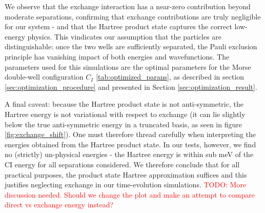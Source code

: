 \documentclass{subfiles}
\begin{document}
We observe that the exchange interaction has a near-zero contribution beyond moderate separations, confirming that exchange contributions are truly negligible for our system - and that the Hartree product state captures the correct low-energy physics. This vindicates our assumption that the particles are distinguishable: once the two wells are sufficiently separated, the Pauli exclusion principle has vanishing impact of both energies and wavefunctions. The parameters used for this simulations are the optimal parameters for the Morse double-well configuration $C_I$ \ref{tab:optimized_parans}, as described in section \ref{sec:optimization_procedure} and presented in Section \ref{sec:optimization_result}. 

A final caveat: because the Hartree product state is not anti-symmetric, the Hartree energy is not variational with respect to exchange (it can lie slightly below the true anti-symmetric energy in a truncated basis, as seen in figure \ref{fig:exchange_shift}). One must therefore thread carefully when interpreting the energies obtained from the Hartree product state. In our tests, however, we find no (strictly) un-physical energies - the Hartree energy is within sub meV of the CI energy for all separations considered. We therefore conclude that for all practical purposes, the product state Hartree approximation suffices and this justifies neglecting exchange in our time-evolution simulations. \textcolor{red}{TODO: More discussion needed. Should we change the plot and make an attempt to compare direct vs exchange energy instead?}
\end{document}
